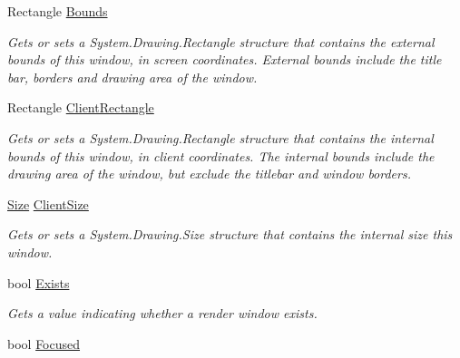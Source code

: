 \begin{DoxyCompactItemize}
\item 
Rectangle \hyperlink{class_open_t_k_1_1_native_window_ac0325973134062eba62484df45236464}{Bounds}
\begin{DoxyCompactList}\small\item\em Gets or sets a System.\-Drawing.\-Rectangle structure that contains the external bounds of this window, in screen coordinates. External bounds include the title bar, borders and drawing area of the window. \end{DoxyCompactList}\item 
Rectangle \hyperlink{class_open_t_k_1_1_native_window_a397e3c3a3a98d0660bd9463090422bf6}{Client\-Rectangle}
\begin{DoxyCompactList}\small\item\em Gets or sets a System.\-Drawing.\-Rectangle structure that contains the internal bounds of this window, in client coordinates. The internal bounds include the drawing area of the window, but exclude the titlebar and window borders. \end{DoxyCompactList}\item 
\hyperlink{class_open_t_k_1_1_native_window_a956be027bb7ba880507909d919b2ad6a}{Size} \hyperlink{class_open_t_k_1_1_native_window_ac863b486a8c7e3d5d6b09aae1c010eac}{Client\-Size}
\begin{DoxyCompactList}\small\item\em Gets or sets a System.\-Drawing.\-Size structure that contains the internal size this window. \end{DoxyCompactList}\item 
bool \hyperlink{class_open_t_k_1_1_native_window_a150f5a96451228bfc91fe9587eb64c19}{Exists}
\begin{DoxyCompactList}\small\item\em Gets a value indicating whether a render window exists. \end{DoxyCompactList}\item 
bool \hyperlink{class_open_t_k_1_1_native_window_ad68c0c086e7733e7a55745425c4faf5d}{Focused}

\end{DoxyCompactItemize}
